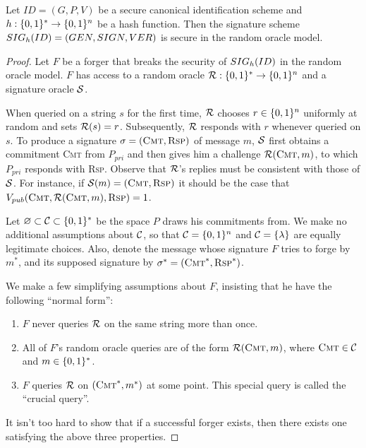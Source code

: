 \documentclass[12pt,twoside]{article}
\begin{document}
\begin{thm}
Let $ID = (G,P,V)$ be a secure canonical identification scheme and $h:
\strs{*} \to \strs{n}$ be a hash function. Then the signature scheme 
$\fs{ID}{h} = (GEN,SIGN,VER)$ is secure in the random oracle model.
\end{thm}
\begin{proof}
Let $F$ be a forger that breaks the security of $\fs{ID}{h}$ in the random
oracle model. $F$ has access to a random oracle $\fanr : \strs{*} \to \strs{n}$
and a signature oracle $\fans$. 

\medskip\noindent
When queried on a string $s$ for the first time, $\fanr$ chooses $r \in
\strs{n}$ uniformly at random and sets $\fanr(s) = r$. Subsequently, $\fanr$
responds with $r$ whenever queried on $s$. To produce a signature 
$\sigma = (\textsc{Cmt},\textsc{Rsp})$ of message $m$, $\fans$ first obtains a 
commitment \textsc{Cmt} from $P_{pri}$ and then gives him 
a challenge $\fanr(\textsc{Cmt},m)$, to which $P_{pri}$ responds with 
\textsc{Rsp}. Observe that $\fanr$'s replies must be consistent with 
those of $\fans$. For instance, if $\fans(m) = 
(\textsc{Cmt},\textsc{Rsp})$ it should be the case that 
$V_{pub}(\textsc{Cmt},\fanr(\textsc{Cmt},m),\textsc{Rsp}) = 1$.

\medskip\noindent
Let $\varnothing \subset \fanc \subset \strs{*}$ be the space $P$ draws his 
commitments from. We make no additional assumptions about $\fanc$, so that 
$\fanc = \strs{n}$ and $\fanc = \{\lambda\}$ are equally legitimate choices. 
Also, denote the message whose signature $F$ tries to forge by $m^*$, and its 
supposed signature by $\sigma^* = (\textsc{Cmt}^*, \textsc{Rsp}^*)$.

\medskip\noindent
We make a few simplifying assumptions about $F$, insisting that 
he have the following ``normal form'': 
\begin{enumerate}[$(i)$]
\item $F$ never queries $\fanr$ on the same string more than once. 

\item All of $F$'s random oracle queries are of the form
$\fanr(\textsc{Cmt},m)$, where $\textsc{Cmt} \in \fanc$ and $m \in \strs{*}$.

\item $F$ queries $\fanr$ on $(\textsc{Cmt}^*,m^*)$ at some point. This 
special query is called the ``crucial query''. 
\end{enumerate}
It isn't too hard to show that if a successful forger 
exists, then there exists one satisfying the above three properties. 


\end{proof}
\end{document}
